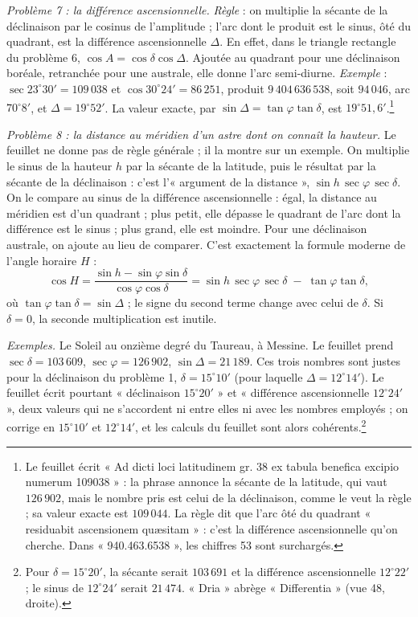 \documentclass[11pt,a4paper]{article}
\begin{document}
\emph{Problème 7 : la différence ascensionnelle.} \emph{Règle} : on multiplie la
sécante de la déclinaison par le cosinus de l'amplitude ; l'arc dont le produit
est le sinus, ôté du quadrant, est la différence ascensionnelle $\Delta$. En effet,
dans le triangle rectangle du problème 6, $\cos A = \cos\delta\cos\Delta$. Ajoutée
au quadrant pour une déclinaison boréale, retranchée pour une australe, elle donne
l'arc semi-diurne. \emph{Exemple} : $\sec 23^\circ 30' = 109\,038$ et
$\cos 30^\circ 24' = 86\,251$, produit $9\,404\,636\,538$, soit $94\,046$, arc
$70^\circ 8'$, et $\Delta = 19^\circ 52'$. La valeur exacte, par
$\sin\Delta = \tan\varphi\tan\delta$, est $19^\circ 51{,}6'$.\footnote{Le feuillet
écrit « Ad dicti loci latitudinem gr. 38 ex tabula benefica excipio numerum
109038 » : la phrase annonce la sécante de la latitude, qui vaut $126\,902$, mais
le nombre pris est celui de la déclinaison, comme le veut la règle ; sa valeur
exacte est $109\,044$. La règle dit que l'arc ôté du quadrant « residuabit
ascensionem quæsitam » : c'est la différence ascensionnelle qu'on cherche. Dans
« 940.463.6538 », les chiffres 53 sont surchargés.}

\emph{Problème 8 : la distance au méridien d'un astre dont on connaît la hauteur.}
Le feuillet ne donne pas de règle générale ; il la montre sur un exemple. On
multiplie le sinus de la hauteur $h$ par la sécante de la latitude, puis le
résultat par la sécante de la déclinaison : c'est l'« argument de la distance »,
$\sin h\,\sec\varphi\,\sec\delta$. On le compare au sinus de la différence
ascensionnelle : égal, la distance au méridien est d'un quadrant ; plus petit,
elle dépasse le quadrant de l'arc dont la différence est le sinus ; plus grand,
elle est moindre. Pour une déclinaison australe, on ajoute au lieu de comparer.
C'est exactement la formule moderne de l'angle horaire $H$ :
\[
\cos H = \frac{\sin h - \sin\varphi\sin\delta}{\cos\varphi\cos\delta}
       = \sin h\,\sec\varphi\,\sec\delta \;-\; \tan\varphi\tan\delta ,
\]
où $\tan\varphi\tan\delta = \sin\Delta$ ; le signe du second terme change avec
celui de $\delta$. Si $\delta = 0$, la seconde multiplication est inutile.

\emph{Exemples.} Le Soleil au onzième degré du Taureau, à Messine. Le feuillet
prend $\sec\delta = 103\,609$, $\sec\varphi = 126\,902$, $\sin\Delta = 21\,189$.
Ces trois nombres sont justes pour la déclinaison du problème 1,
$\delta = 15^\circ 10'$ (pour laquelle $\Delta = 12^\circ 14'$). Le feuillet
écrit pourtant « déclinaison $15^\circ 20'$ » et « différence ascensionnelle
$12^\circ 24'$ », deux valeurs qui ne s'accordent ni entre elles ni avec les
nombres employés ; on corrige en $15^\circ 10'$ et $12^\circ 14'$, et les calculs
du feuillet sont alors cohérents.\footnote{Pour $\delta = 15^\circ 20'$, la
sécante serait $103\,691$ et la différence ascensionnelle $12^\circ 22'$ ; le
sinus de $12^\circ 24'$ serait $21\,474$. « Dria » abrège « Differentia » (vue 48,
droite).}
\end{document}
